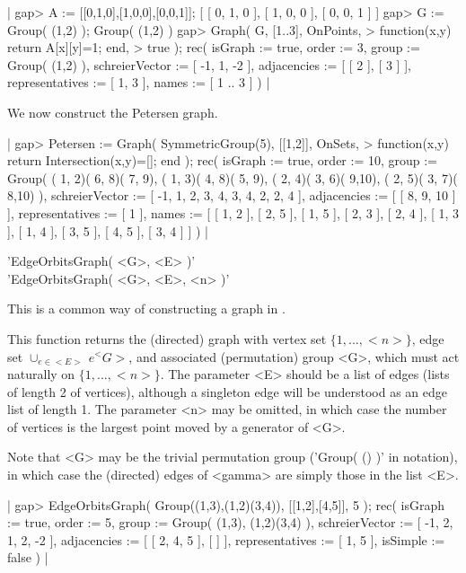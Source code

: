 |    gap> A := [[0,1,0],[1,0,0],[0,0,1]];
    [ [ 0, 1, 0 ], [ 1, 0, 0 ], [ 0, 0, 1 ] ]
    gap> G := Group( (1,2) );
    Group( (1,2) )
    gap> Graph( G, [1..3], OnPoints,
    >           function(x,y) return A[x][y]=1; end,
    >           true );
    rec(
      isGraph := true,
      order := 3,
      group := Group( (1,2) ),
      schreierVector := [ -1, 1, -2 ],
      adjacencies := [ [ 2 ], [ 3 ] ],
      representatives := [ 1, 3 ],
      names := [ 1 .. 3 ] ) |

We now construct the Petersen graph.

|    gap> Petersen := Graph( SymmetricGroup(5), [[1,2]], OnSets,
    >                 function(x,y) return Intersection(x,y)=[]; end );
    rec(
      isGraph := true,
      order := 10,
      group := Group( ( 1, 2)( 6, 8)( 7, 9), ( 1, 3)( 4, 8)( 5, 9),
        ( 2, 4)( 3, 6)( 9,10), ( 2, 5)( 3, 7)( 8,10) ),
      schreierVector := [ -1, 1, 2, 3, 4, 3, 4, 2, 2, 4 ],
      adjacencies := [ [ 8, 9, 10 ] ],
      representatives := [ 1 ],
      names := [ [ 1, 2 ], [ 2, 5 ], [ 1, 5 ], [ 2, 3 ], [ 2, 4 ],
          [ 1, 3 ], [ 1, 4 ], [ 3, 5 ], [ 4, 5 ], [ 3, 4 ] ] ) |


'EdgeOrbitsGraph( <G>, <E> )' \\
'EdgeOrbitsGraph( <G>, <E>, <n> )'

This is a common way of constructing a graph in {\GRAPE}.

This   function   returns   the   (directed)   graph  with   vertex   set
$\{1,...,<n>\}$,  edge  set  $\cup_{e\in <E>}\, e^<G>$,   and  associated
(permutation) group <G>, which  must  act naturally  on  $\{1,...,<n>\}$.
The  parameter  <E>  should  be a  list  of edges (lists of  length 2  of
vertices), although a  singleton edge  will be understood as an edge list
of length 1.  The parameter <n>  may be omitted, in which case the number
of vertices is the largest point moved by a generator of <G>.

Note  that <G> may  be  the trivial permutation group  ('Group( () )'  in
{\GAP}  notation), in which case  the  (directed) edges  of  <gamma>  are
simply those in the list <E>.

|    gap> EdgeOrbitsGraph( Group((1,3),(1,2)(3,4)), [[1,2],[4,5]], 5 );
    rec(
      isGraph := true,
      order := 5,
      group := Group( (1,3), (1,2)(3,4) ),
      schreierVector := [ -1, 2, 1, 2, -2 ],
      adjacencies := [ [ 2, 4, 5 ], [  ] ],
      representatives := [ 1, 5 ],
      isSimple := false ) |

